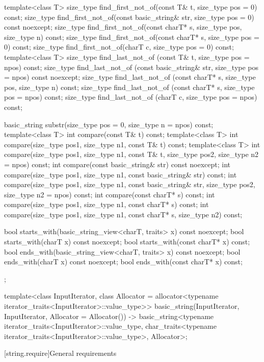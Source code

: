 \begin{codeblock}
{{    template<class T>
      size_type find_first_not_of(const T& t, size_type pos = 0) const;
    size_type find_first_not_of(const basic_string& str, size_type pos = 0) const noexcept;
    size_type find_first_not_of(const charT* s, size_type pos, size_type n) const;
    size_type find_first_not_of(const charT* s, size_type pos = 0) const;
    size_type find_first_not_of(charT c, size_type pos = 0) const;
    template<class T>
      size_type find_last_not_of (const T& t, size_type pos = npos) const;
    size_type find_last_not_of (const basic_string& str, size_type pos = npos) const noexcept;
    size_type find_last_not_of (const charT* s, size_type pos, size_type n) const;
    size_type find_last_not_of (const charT* s, size_type pos = npos) const;
    size_type find_last_not_of (charT c, size_type pos = npos) const;

    basic_string substr(size_type pos = 0, size_type n = npos) const;
    template<class T>
      int compare(const T& t) const;
    template<class T>
      int compare(size_type pos1, size_type n1, const T& t) const;
    template<class T>
      int compare(size_type pos1, size_type n1, const T& t,
                  size_type pos2, size_type n2 = npos) const;
    int compare(const basic_string& str) const noexcept;
    int compare(size_type pos1, size_type n1, const basic_string& str) const;
    int compare(size_type pos1, size_type n1, const basic_string& str,
                size_type pos2, size_type n2 = npos) const;
    int compare(const charT* s) const;
    int compare(size_type pos1, size_type n1, const charT* s) const;
    int compare(size_type pos1, size_type n1, const charT* s, size_type n2) const;

    bool starts_with(basic_string_view<charT, traits> x) const noexcept;
    bool starts_with(charT x) const noexcept;
    bool starts_with(const charT* x) const;
    bool ends_with(basic_string_view<charT, traits> x) const noexcept;
    bool ends_with(charT x) const noexcept;
    bool ends_with(const charT* x) const;
  };

  template<class InputIterator,
           class Allocator = allocator<typename iterator_traits<InputIterator>::value_type>>
    basic_string(InputIterator, InputIterator, Allocator = Allocator())
      -> basic_string<typename iterator_traits<InputIterator>::value_type,
                      char_traits<typename iterator_traits<InputIterator>::value_type>,
                      Allocator>;
}
\end{codeblock}

[string.require]{General requirements}

